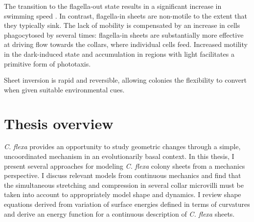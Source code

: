 The transition to the flagella-out state results in a significant increase in swimming speed \citep{brunet2019}. 
In contrast, flagella-in sheets are non-motile to the extent that they typically sink. 
The lack of mobility is compensated by an increase in cells phagocytosed by several times: flagella-in sheets are substantially more effective at driving flow towards the collars, where individual cells feed.
Increased motility in the dark-induced state and accumulation in regions with light facilitates a primitive form of phototaxis.

Sheet inversion is rapid and reversible, allowing colonies the flexibility to convert when given suitable environmental cues.



% 

\section{Thesis overview}

\textit{C. flexa} provides an opportunity to study geometric changes through a simple, uncoordinated mechanism in an evolutionarily basal context. 
In this thesis, I present several approaches for modeling \textit{C. flexa} colony sheets from a mechanics perspective. 
I discuss relevant models from continuous mechanics and find that the simultaneous stretching and compression in several collar microvilli must be taken into account to appropriately model shape and dynamics. 
I review shape equations derived from variation of surface energies defined in terms of curvatures and derive an energy function for a continuous description of \textit{C. flexa} sheets. 

